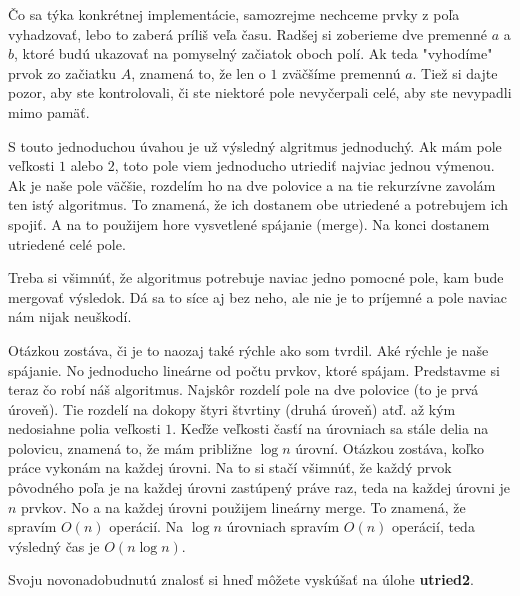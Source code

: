 Čo sa týka konkrétnej implementácie, samozrejme nechceme prvky z poľa vyhadzovať, lebo to zaberá
príliš veľa času. Radšej si zoberieme dve premenné $a$ a $b$, ktoré budú ukazovať na pomyselný
začiatok oboch polí. Ak teda "vyhodíme" prvok zo začiatku $A$, znamená to, že len o $1$ zväčšíme
premennú $a$. Tiež si dajte pozor, aby ste kontrolovali, či ste niektoré pole nevyčerpali celé, aby
ste nevypadli mimo pamäť.

S touto jednoduchou úvahou je už výsledný algritmus jednoduchý. Ak mám pole veľkosti $1$ alebo $2$,
toto pole viem jednoducho utriediť najviac jednou výmenou. Ak je naše pole väčšie, rozdelím ho na
dve polovice a na tie rekurzívne zavolám ten istý algoritmus. To znamená, že ich dostanem obe
utriedené a potrebujem ich spojiť. A na to použijem hore vysvetlené spájanie (merge). Na konci
dostanem utriedené celé pole.

Treba si všimnúť, že algoritmus potrebuje naviac jedno pomocné pole, kam bude mergovať výsledok. Dá
sa to síce aj bez neho, ale nie je to príjemné a pole naviac nám nijak neuškodí.

Otázkou zostáva, či je to naozaj také rýchle ako som tvrdil. Aké rýchle je naše spájanie. No
jednoducho lineárne od počtu prvkov, ktoré spájam. Predstavme si teraz čo robí náš algoritmus.
Najskôr rozdelí pole na dve polovice (to je prvá úroveň). Tie rozdelí na dokopy štyri štvrtiny
(druhá úroveň) atď. až kým nedosiahne polia veľkosti $1$. Keďže veľkosti časťí na úrovniach sa stále
delia na polovicu, znamená to, že mám približne $\log n$ úrovní. Otázkou zostáva, koľko práce
vykonám na každej úrovni. Na to si stačí všimnúť, že každý prvok pôvodného poľa je na každej úrovni
zastúpený práve raz, teda na každej úrovni je $n$ prvkov. No a na každej úrovni použijem lineárny
merge. To znamená, že spravím $O(n)$ operácií. Na $\log n$ úrovniach spravím $O(n)$ operácií, teda
výsledný čas je $O(n \log n)$.

\medskip

Svoju novonadobudnutú znalosť si hneď môžete vyskúšať na úlohe \textbf{utried2}.

\medskip



